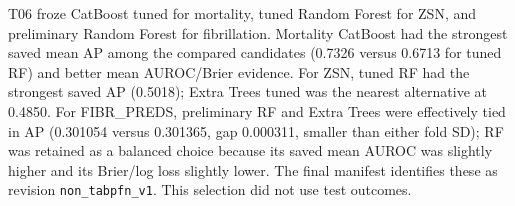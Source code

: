 T06 froze CatBoost tuned for mortality, tuned Random Forest for ZSN, and preliminary Random Forest for fibrillation. Mortality CatBoost had the strongest saved mean AP among the compared candidates (0.7326 versus 0.6713 for tuned RF) and better mean AUROC/Brier evidence. For ZSN, tuned RF had the strongest saved AP (0.5018); Extra Trees tuned was the nearest alternative at 0.4850. For FIBR\_PREDS, preliminary RF and Extra Trees were effectively tied in AP (0.301054 versus 0.301365, gap 0.000311, smaller than either fold SD); RF was retained as a balanced choice because its saved mean AUROC was slightly higher and its Brier/log loss slightly lower. The final manifest identifies these as revision \texttt{non\_tabpfn\_v1}. This selection did not use test outcomes.
